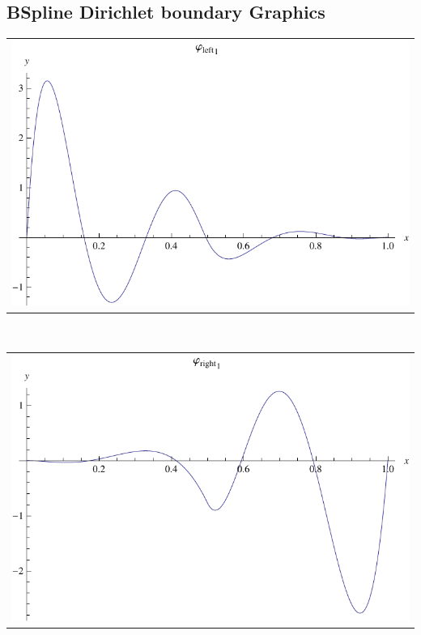 \documentclass{article}
\begin{document}
\begin{landscape}
\begin{eqnarray*}
\begin{array}{cc}
\end{array}\end{eqnarray*}
\end{landscape}
\begin{landscape}
\subsection{BSpline Dirichlet boundary Graphics}
\begin{tabular}{c}
\includegraphics[width=20.cm]{quintic_bspline_dleft_1.pdf}\end{tabular} 
 \\ 
\begin{tabular}{c}
\includegraphics[width=20.cm]{quintic_bspline_dright_1.pdf}\end{tabular} 
 \end{landscape}
\end{document}
